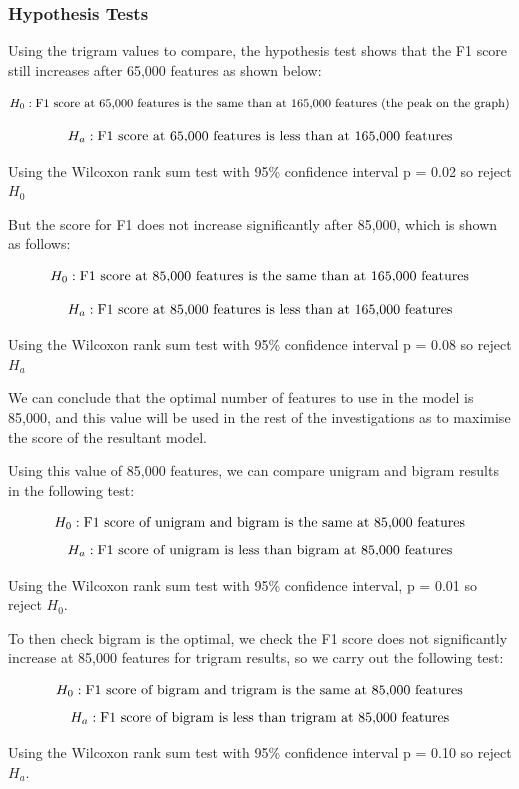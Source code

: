 \subsubsection{Hypothesis Tests}

Using the trigram values to compare, the hypothesis test shows that the F1 score still increases after 65,000 features as shown below:

$$ H_0:  \textnormal{F1 score at 65,000 features is the same than at 165,000 features (the peak on the graph)}$$

$$ H_a: \textnormal{F1 score at 65,000 features is less than at 165,000 features} $$


Using the Wilcoxon rank sum test with 95\% confidence interval p = 0.02 so reject $H_0$

But the score for F1 does not increase significantly after 85,000, which is shown as follows:

$$ H_0:  \textnormal{F1 score at 85,000 features is the same than at 165,000 features}$$

$$ H_a: \textnormal{F1 score at 85,000 features is less than at 165,000 features} $$

Using the Wilcoxon rank sum test with 95\% confidence interval p = 0.08 so reject $H_a$


We can conclude that the optimal number of features to use in the model is 85,000,  and this value will be used in the rest of the investigations as to maximise the score of the resultant model. 

Using this value of 85,000 features, we can compare unigram and bigram results in the following test:

$$ H_0: \textnormal{F1 score of unigram and bigram is the same at 85,000 features} $$
$$ H_a: \textnormal{F1 score of unigram is less than bigram at 85,000 features} $$

Using the Wilcoxon rank sum test with 95\% confidence interval, p = 0.01 so reject $H_0$.

To then check bigram is the optimal, we check the F1 score does not significantly increase at 85,000 features for trigram results, so we carry out the following test:

$$ H_0: \textnormal{F1 score of bigram and trigram is the same at 85,000 features} $$
$$ H_a: \textnormal{F1 score of bigram is less than trigram at 85,000 features} $$

Using the Wilcoxon rank sum test with 95\% confidence interval p = 0.10 so reject $H_a$.

